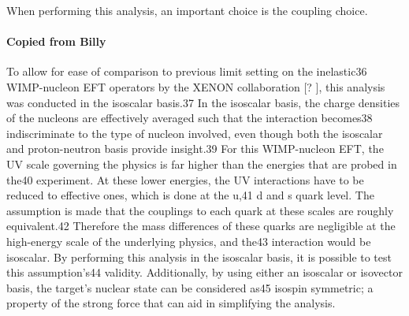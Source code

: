 \par
When performing this analysis, an important choice is the coupling choice.


\paragraph{Copied from Billy}
\par
To allow for ease of comparison to previous limit setting on the inelastic36
WIMP-nucleon EFT operators by the XENON collaboration [? ], this analysis was conducted in the isoscalar basis.37
In the isoscalar basis, the charge densities of the nucleons are effectively averaged such that the interaction becomes38
indiscriminate to the type of nucleon involved, even though both the isoscalar and proton-neutron basis provide insight.39
For this WIMP-nucleon EFT, the UV scale governing the physics is far higher than the energies that are probed in the40
experiment. At these lower energies, the UV interactions have to be reduced to effective ones, which is done at the u,41
d and s quark level. The assumption is made that the couplings to each quark at these scales are roughly equivalent.42
Therefore the mass differences of these quarks are negligible at the high-energy scale of the underlying physics, and the43
interaction would be isoscalar. By performing this analysis in the isoscalar basis, it is possible to test this assumption’s44
validity. Additionally, by using either an isoscalar or isovector basis, the target’s nuclear state can be considered as45
isospin symmetric; a property of the strong force that can aid in simplifying the analysis.